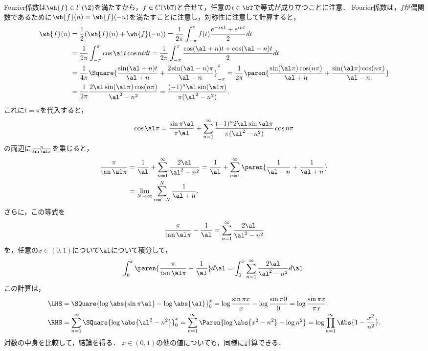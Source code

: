 \documentclass[uplatex,dvipdfmx]{jsreport}
\begin{document}
\begin{Proof}
    Fourier係数は$\wh{f}\in l^1(\Z)$を満たすから，$f\in C(\bT)$と合せて，任意の$t\in\bT$で等式が成り立つことに注意．
    Fourier係数は，$f$が偶関数であるために$\wh{f}(n)=\wh{f}(-n)$を満たすことに注意し，対称性に注意して計算すると，
    \begin{align*}
        \wh{f}(n)&=\frac{1}{2}(\wh{f}(n)+\wh{f}(-n))=\frac{1}{2\pi}\int^\pi_{-\pi}f(t)\frac{e^{-int}+e^{int}}{2}dt\\
        &=\frac{1}{2\pi}\int^\pi_{-\pi}\cos\al t\cos ntdt=\frac{1}{2\pi}\int^\pi_{-\pi}\frac{\cos(\al+n)t+\cos(\al-n)t}{2}dt\\
        &=\frac{1}{4\pi}\Square{\frac{\sin(\al+n)t}{\al+n}+\frac{2\sin(\al-n)\pi}{\al-n}}^\pi_{-\pi}=\frac{1}{2\pi}\paren{\frac{\sin(\al\pi)\cos(n\pi)}{\al+n}+\frac{\sin(\al\pi)\cos(n\pi)}{\al-n}}\\
        &=\frac{1}{2\pi}\frac{2\al\sin(\al\pi)\cos(n\pi)}{\al^2-n^2}=\frac{(-1)^n\al\sin(\al\pi)}{\pi(\al^2-n^2)}.
    \end{align*}
    これに$t=\pi$を代入すると，
    \[\cos\al\pi=\frac{\sin\pi\al}{\pi\al}+\sum_{n=1}^\infty\frac{(-1)^n2\al\sin\al\pi}{\pi(\al^2-n^2)}\cos n\pi\]
    の両辺に$\frac{\pi}{\sin\al\pi}$を乗じると，
    \begin{align*}
        \frac{\pi}{\tan\al\pi}&=\frac{1}{\al}+\sum_{n=1}^\infty\frac{2\al}{\al^2-n^2}=\frac{1}{\al}+\sum_{n=1}^\infty\paren{\frac{1}{\al-n}+\frac{1}{\al+n}}\\
        &=\lim_{N\to\infty}\sum_{n=-N}^N\frac{1}{\al+n}.
    \end{align*}
    さらに，この等式を
    \[\frac{\pi}{\tan\al\pi}-\frac{1}{\al}=\sum_{n=1}^\infty\frac{2\al}{\al^2-n^2}\]
    を，任意の$x\in(0,1)$について$\al$について積分して，
    \[\int^x_0\paren{\frac{\pi}{\tan\al\pi}-\frac{1}{\al}}d\al=\int^x_0\sum_{n=1}^\infty\frac{2\al}{\al^2-n^2}d\al.\]
    この計算は，
    \begin{align*}
        \LHS&=\SQuare{\log\abs{\sin\pi\al}-\log\abs{\al}}^x_0=\log\frac{\sin\pi x}{x}-\log\frac{\sin\pi 0}{0}=\log\frac{\sin\pi x}{\pi x}.\\
        \RHS&=\sum_{n=1}^\infty\SQuare{\log\abs{\al^2-n^2}}^x_0=\sum_{n=1}^\infty\Paren{\log\abs{x^2-n^2}-\log n^2}=\log\prod^\infty_{n=1}\Abs{1-\frac{x^2}{n^2}}.
    \end{align*}
    対数の中身を比較して，結論を得る．
    $x\in(0,1)$の他の値についても，同様に計算できる．
\end{Proof}
\end{document}
